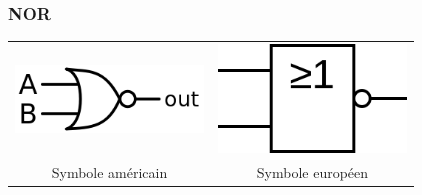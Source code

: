 \documentclass[svgnames,11pt]{beamer}
\begin{document}
\begin{frame}
    \frametitle{NOR}

    \begin{center}
        \begin{tabular}{cc}
            \includegraphics[width=5cm]{ressources/not-or-us.png}
                              &
            \includegraphics[width=5cm]{ressources/not-or-eu.png} \\
            Symbole américain & Symbole européen                  \\
        \end{tabular}
    \end{center}

\end{frame}
\end{document}
